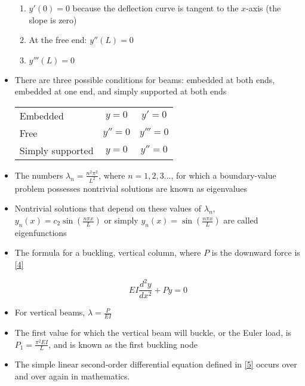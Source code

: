 \documentclass[12pt]{article}
\begin{document}
\begin{itemize}
\begin{enumerate}
        \item $y'(0)=0$ because the deflection curve is tangent to the $x$-axis (the slope is zero)

        \item At the free end: $y''(L)=0$

        \item $y'''(L)=0$

      \end{enumerate}

    \item There are three possible conditions for beams: embedded at both ends, embedded at one end, and simply supported at both ends

      \begin{tabular}[h]{l c c}
        Embedded & $y=0$ & $y'=0$\\
        Free & $y''=0$ & $y'''=0$\\
        Simply supported & $y=0$ & $y''=0$
      \end{tabular}

    \item The numbers $\lambda_n=\frac{n^2\pi^2}{L^2}$, where $n=1,2,3\dots$, for which a boundary-value problem possesses nontrivial solutions are known as eigenvalues

    \item Nontrivial solutions that depend on these values of $\lambda_n$, $y_n(x)=c_2\sin\left(\frac{n\pi x}{L}\right)$ or simply $y_n(x)=\sin\left( \frac{n\pi x}{L} \right)$ are called eigenfunctions 
    
    \item The formula for a buckling, vertical column, where $P$ is the downward force is \eqref{4}

      \begin{equation}
        EI\frac{d^2y}{dx^2}+Py=0
        \label{4}
      \end{equation}

    \item For vertical beams, $\lambda=\frac{P}{EI}$

    \item The first value for which the vertical beam will buckle, or the Euler load, is $P_1=\frac{\pi^2EI}{L}$, and is known as the first buckling node

    \item The simple linear second-order differential equation defined in \eqref{5} occurs over and over again in mathematics. 


\end{itemize}
\end{document}
